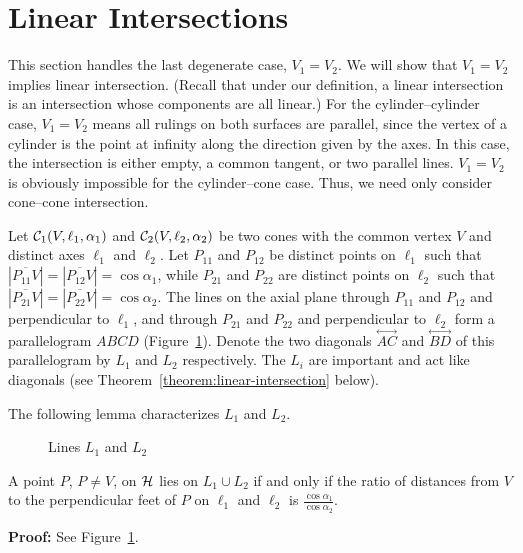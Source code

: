 
\section{Linear Intersections}
\label{section:linear}

This section handles the last degenerate case, $V_1=V_2$.
We will show that $V_1=V_2$ implies linear intersection.
(Recall that under our
definition, a linear intersection is an intersection whose components are all
linear.)  For the cylinder--cylinder case, $V_1=V_2$ means all rulings on both
surfaces are parallel, since the vertex of a cylinder is the point at infinity
along the direction given by the axes.  In this case, the intersection is
either empty, a common tangent, or two parallel lines.  $V_1=V_2$ is obviously
impossible for the cylinder--cone case.  Thus, we need only consider
cone--cone intersection.

\begin{definition}
     Let ${\cal C}_1(V,\ell_1,\alpha_1)$ and ${\cal C}_2(V,\ell_2,\alpha_2)$
be two cones with the common vertex $V$ and distinct axes $\ell_1$ and
$\ell_2$.  Let $P_{11}$ and $P_{12}$ be distinct points on $\ell_1$ such that
$|\overline{P_{11}V}|=|\overline{P_{12}V}|=\cos\alpha_1$, while $P_{21}$ and
$P_{22}$ are distinct points on $\ell_2$ such that
$|\overline{P_{21}V}|=|\overline{P_{22}V}|=\cos\alpha_2$.
The lines on the axial plane through $P_{11}$ and $P_{12}$ and perpendicular
to $\ell_1$, and through $P_{21}$ and $P_{22}$ and perpendicular to $\ell_2$
form a parallelogram $ABCD$ (Figure~\ref{fig:linear}).  Denote the two
diagonals $\stackrel{\longleftrightarrow}{AC}$ and
$\stackrel{\longleftrightarrow}{BD}$ of this parallelogram by $L_1$ and $L_2$
respectively.
The $L_i$ are important and act like diagonals (see
Theorem~\ref{theorem:linear-intersection} below).
\end{definition}

The following lemma characterizes $L_1$ and $L_2$.

\begin{figure}
\vspace{4.5cm}
\caption{Lines $L_1$ and $L_2$}
\label{fig:linear}
\end{figure}

\begin{lemma}
\label{lemma:L1-L2}
     A point $P$, $P\neq V$, on ${\cal H}$ lies on $L_1\cup L_2$ if and only
if the ratio of distances from $V$ to the perpendicular feet of $P$ on
$\ell_1$ and $\ell_2$ is $\frac{\cos\alpha_1}{\cos\alpha_2}$.
\end{lemma}
{\bf Proof:}  See Figure~\ref{fig:linear}. \QED


